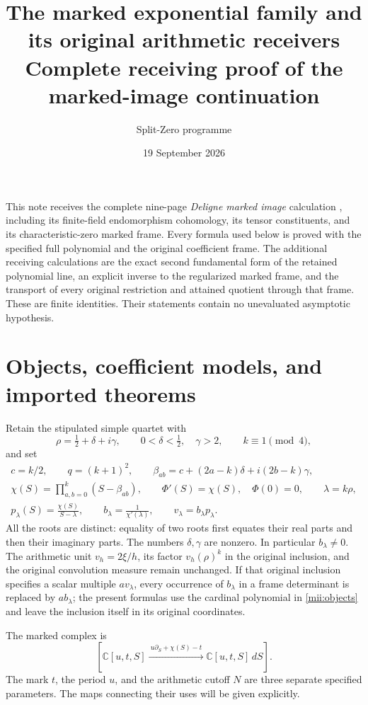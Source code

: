 \documentclass[11pt]{article}
\title{The marked exponential family and its original arithmetic receivers\\
\large Complete receiving proof of the marked-image continuation}
\author{Split-Zero programme}
\date{19 September 2026}
\newcommand{\CC}{\mathbb C}
\begin{document}
\maketitle

This note receives the complete nine-page \emph{Deligne marked image} calculation
\cite{received}, including its finite-field endomorphism cohomology, its tensor
constituents, and its characteristic-zero marked frame. Every formula used below
is proved with the specified full polynomial and the original coefficient frame.
The additional receiving calculations are the exact second fundamental form of
the retained polynomial line, an explicit inverse to the regularized marked
frame, and the transport of every original restriction and attained quotient
through that frame. These are finite identities. Their statements contain no
unevaluated asymptotic hypothesis.

\section{Objects, coefficient models, and imported theorems}
Retain the stipulated simple quartet with
\[
 \rho=\tfrac12+\delta+i\gamma,\qquad 0<\delta<\tfrac12,\quad\gamma>2,
 \qquad k\equiv1\pmod4,
\]
and set
\begin{equation}\tag{MII1}\label{mii:objects}
 \begin{gathered}
 c=k/2,\qquad q=(k+1)^2,\qquad
 \beta_{ab}=c+(2a-k)\delta+i(2b-k)\gamma,\\
 \chi(S)=\prod_{a,b=0}^k(S-\beta_{ab}),\qquad
 \Phi'(S)=\chi(S),\quad\Phi(0)=0,\qquad\lambda=k\rho,\\
 p_\lambda(S)=\frac{\chi(S)}{S-\lambda},\qquad
 b_\lambda=\frac1{\chi'(\lambda)},\qquad v_\lambda=b_\lambda p_\lambda.
 \end{gathered}
\end{equation}
All the roots are distinct: equality of two roots first equates their real
parts and then their imaginary parts. The numbers $\delta,\gamma$ are nonzero.
In particular $b_\lambda\ne0$. The arithmetic unit $v_h=2\xi/h$, its factor
$v_h(\rho)^k$ in the original inclusion, and the original convolution measure
remain unchanged. If that original inclusion specifies a scalar multiple
$a v_\lambda$, every occurrence of $b_\lambda$ in a frame determinant is replaced
by $a b_\lambda$; the present formulas use the cardinal polynomial in
\eqref{mii:objects} and leave the inclusion itself in its original coordinates.

The marked complex is
\begin{equation}\tag{MII2}\label{mii:complex}
 \left[\CC[u,t,S]\xrightarrow{\ u\partial_S+\chi(S)-t\ }
                 \CC[u,t,S]\,dS\right].
\end{equation}
The mark $t$, the period $u$, and the arithmetic cutoff $N$ are three separate
specified parameters. The maps connecting their uses will be given explicitly.
\end{document}
